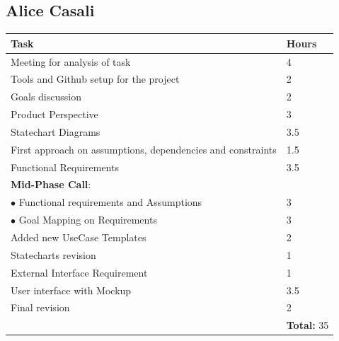 \documentclass{report}
\begin{document}
\subsection*{Alice Casali}
\begin{table}[!ht]
	\begin{tabular}{|C{.60\textwidth}||C{.20\textwidth}|}
		\toprule
		\textbf{Task} & \textbf{Hours}\\
		\midrule
		\midrule
		Meeting for analysis of task & 4\\
		\midrule
		Tools and Github setup for the project & 2\\
		\midrule
		Goals discussion & 2\\
		\midrule
		Product Perspective & 3\\ 
		\midrule
		Statechart Diagrams & 3.5\\
		\midrule
		First approach on assumptions, dependencies and constraints & 1.5\\
		\midrule
		Functional Requirements & 3.5\\ 
		\midrule
		\small{\textbf{Mid-Phase Call}}: & \\
		\vspace{.2mm}
		$\bullet$ Functional requirements and Assumptions & \vspace{.2mm} 3\\
		$\bullet$ Goal Mapping on Requirements & 3\\
		\midrule
		Added new UseCase Templates & 2 \\
		\midrule
		Statecharts revision & 1\\
		\midrule
		External Interface Requirement & 1\\
		\midrule
		User interface with Mockup & 3.5\\
		\midrule
		Final revision & 2\\
		& \textbf{Total:} 35\\
		\bottomrule
	\end{tabular}
\end{table}
\end{document}
